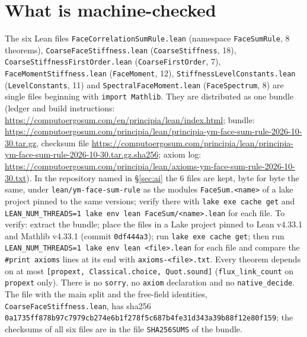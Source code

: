 \documentclass[11pt,a4paper]{article}
\theoremstyle{definition}
\theoremstyle{remark}
\newcommand{\code}[1]{\texttt{#1}}
\begin{document}
\section{What is machine-checked}\label{sec:lean}

{\raggedright The six Lean files \code{FaceCorrelationSumRule.lean} (namespace \code{FaceSumRule}, 8 theorems), \code{CoarseFaceStiffness.lean} (\code{CoarseStiffness}, 18), \code{CoarseStiffnessFirstOrder.lean} (\code{CoarseFirstOrder}, 7), \code{FaceMomentStiffness.lean} (\code{FaceMoment}, 12), \code{StiffnessLevelConstants.lean} (\code{LevelConstants}, 11) and \code{SpectralFaceMoment.lean} (\code{FaceSpectrum}, 8) are single files beginning with \code{import Mathlib}. They are distributed as one bundle (ledger and build instructions: \url{https://computoergosum.com/en/principia/lean/index.html}; bundle: \url{https://computoergosum.com/principia/lean/principia-ym-face-sum-rule-2026-10-30.tar.gz}, checksum file \url{https://computoergosum.com/principia/lean/principia-ym-face-sum-rule-2026-10-30.tar.gz.sha256}; axiom log: \url{https://computoergosum.com/principia/lean/axioms-ym-face-sum-rule-2026-10-30.txt}). In the repository named in \S\ref{sec:ai} the 6 files are kept, byte for byte the same, under \code{lean/\allowbreak{}ym-face-sum-rule} as the modules \code{FaceSum.<name>} of a lake project pinned to the same versions; verify there with \code{lake exe cache get} and \code{LEAN\_NUM\_THREADS=1 lake env lean FaceSum/\allowbreak{}<name>.lean} for each file. To verify: extract the bundle; place the files in a Lake project pinned to Lean v4.33.1 and Mathlib v4.33.1 (commit \code{0df444a3}); run \code{lake exe cache get}; then run \code{LEAN\_NUM\_THREADS=1 lake env lean <file>.lean} for each file and compare the \code{\#print axioms} lines at its end with \code{axioms-<file>.txt}. Every theorem depends on at most \code{[propext, Classical.choice, Quot.sound]} (\code{flux\_link\_count} on \code{propext} only). There is no \code{sorry}, no \code{axiom} declaration and no \code{native\_decide}. The file with the main split and the free-field identities, \code{CoarseFaceStiffness.lean}, has sha256 \code{0a1735ff\allowbreak 878b97c7\allowbreak 979cb274\allowbreak e6b1f278\allowbreak f5c687b4\allowbreak fe31d343\allowbreak a39b88f1\allowbreak 2e80f159}; the checksums of all six files are in the file \code{SHA256SUMS} of the bundle.\par}
\end{document}
